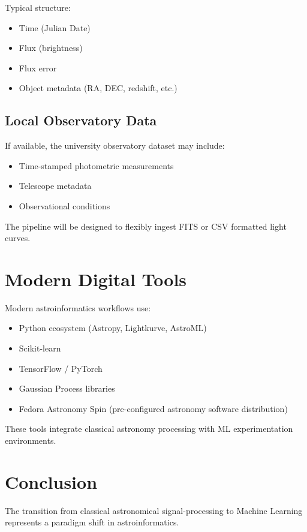 \documentclass[12pt]{article}
\begin{document}
Typical structure:

\begin{itemize}
    \item Time (Julian Date)
    \item Flux (brightness)
    \item Flux error
    \item Object metadata (RA, DEC, redshift, etc.)
\end{itemize}

\subsection{Local Observatory Data}

If available, the university observatory dataset may include:

\begin{itemize}
    \item Time-stamped photometric measurements
    \item Telescope metadata
    \item Observational conditions
\end{itemize}

The pipeline will be designed to flexibly ingest FITS or CSV formatted light curves.

\section{Modern Digital Tools}

Modern astroinformatics workflows use:

\begin{itemize}
    \item Python ecosystem (Astropy, Lightkurve, AstroML)
    \item Scikit-learn
    \item TensorFlow / PyTorch
    \item Gaussian Process libraries
    \item Fedora Astronomy Spin (pre-configured astronomy software distribution)
\end{itemize}

These tools integrate classical astronomy processing with ML experimentation environments.

\section{Conclusion}

The transition from classical astronomical signal-processing to Machine Learning represents a paradigm shift in astroinformatics.
\end{document}
